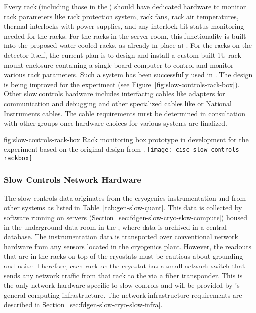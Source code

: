 Every rack (including those in the ) should have dedicated hardware to monitor rack parameters like rack protection system, rack fans, rack air temperatures, thermal interlocks with power supplies, and any interlock bit status monitoring needed for the racks. For the racks in the  server room, this functionality is built into the proposed water cooled racks, as already in place at .  For the racks on the detector itself, the current plan is to design and install a custom-built 1U rack-mount enclosure containing a single-board computer to control and monitor various rack parameters. Such a system has been successfully used in . The design is being improved for the  experiment (see Figure~\ref{fig:slow-controls-rack-box}). Other slow controls hardware includes interfacing cables like adapters for communication and debugging and other specialized cables like   or National Instruments cables. The cable requirements must be determined in consultation with other groups once hardware choices for various systems are finalized.

\begin{dunefigure}{fig:slow-controls-rack-box}
{Rack monitoring box prototype in development for the  experiment based on the original design from .}
\texttt{[image: cisc-slow-controls-rackbox]}
\end{dunefigure}


\subsubsection{Slow Controls Network Hardware}
\label{sec:fdgen-slow-cryo-slow-network}
The slow controls data originates from the cryogenics instrumentation and from other systems as listed in Table~\ref{tab:gen-slow-quant}. This data is collected by software running on servers
(Section~\ref{sec:fdgen-slow-cryo-slow-compute})
housed in the underground data room in the ,
where data is archived in a central  database.
The instrumentation data is transported over
conventional network hardware from any sensors located in the cryogenics
plant.  However, the readouts that are in the racks on top of the
cryostats must be cautious about grounding and noise.  Therefore, each
rack on the cryostat has a small network switch that sends
any network traffic from that rack to the  via a fiber transponder.
This is the only network hardware specific to slow controls and will be provided by %
's  
general computing infrastructure. %
The network infrastructure requirements are described in
Section~\ref{sec:fdgen-slow-cryo-slow-infra}.

